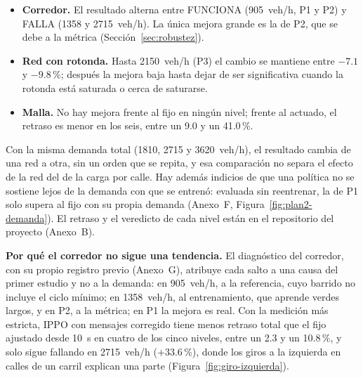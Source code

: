 \begin{itemize}
  \item \textbf{Corredor.} El resultado alterna entre FUNCIONA
    (905~veh/h, P1 y P2) y FALLA (1358 y 2715~veh/h). La única mejora
    grande es la de P2, que se debe a la métrica
    (Sección~\ref{sec:robustez}).
  \item \textbf{Red con rotonda.} Hasta 2150~veh/h (P3) el cambio se
    mantiene entre $-7.1$ y $-9.8$\,\%; después la mejora baja hasta
    dejar de ser significativa cuando la rotonda está saturada o cerca de
    saturarse.
  \item \textbf{Malla.} No hay mejora frente al fijo en ningún nivel;
    frente al actuado, el retraso es menor en los seis, entre un 9.0 y
    un 41.0\,\%.
\end{itemize}
Con la misma demanda total (1810, 2715 y 3620~veh/h), el resultado
cambia de una red a otra, sin un orden que se repita, y esa comparación
no separa el efecto de la red del de la carga por calle. Hay además
indicios de que una política no se sostiene lejos de la demanda con que
se entrenó: evaluada sin reentrenar, la de P1 solo supera al fijo con su
propia demanda (Anexo~F, Figura~\ref{fig:plan2-demanda}). El retraso y
el veredicto de cada nivel están en el repositorio del proyecto
(Anexo~B).

\label{sec:diag-corredor}
\noindent\textbf{Por qué el corredor no sigue una tendencia.} El
diagnóstico del corredor, con su propio registro previo (Anexo~G),
atribuye cada salto a una causa del primer estudio y no a la demanda: en
905~veh/h, a la referencia, cuyo barrido no incluye el ciclo mínimo; en
1358~veh/h, al entrenamiento, que aprende verdes largos, y en P2, a la
métrica; en P1 la mejora es real. Con la medición más estricta, IPPO con mensajes corregido tiene
menos retraso total que el fijo ajustado desde 10~s en cuatro de los
cinco niveles, entre un 2.3 y un 10.8\,\%, y solo sigue fallando en
2715~veh/h ($+33.6$\,\%), donde los giros a la izquierda en calles de un
carril explican una parte (Figura~\ref{fig:giro-izquierda}).

